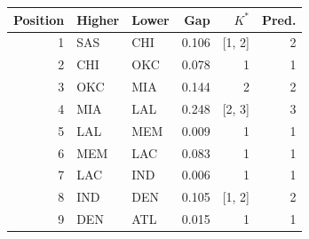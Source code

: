 \begin{tabular}{rllrrr}
\toprule
Position & Higher & Lower & Gap & $K^*$ & Pred. \\
\midrule
1 & SAS & CHI & 0.106 & [1, 2] & 2 \\
2 & CHI & OKC & 0.078 & 1 & 1 \\
3 & OKC & MIA & 0.144 & 2 & 2 \\
4 & MIA & LAL & 0.248 & [2, 3] & 3 \\
5 & LAL & MEM & 0.009 & 1 & 1 \\
6 & MEM & LAC & 0.083 & 1 & 1 \\
7 & LAC & IND & 0.006 & 1 & 1 \\
8 & IND & DEN & 0.105 & [1, 2] & 2 \\
9 & DEN & ATL & 0.015 & 1 & 1 \\
\bottomrule
\end{tabular}
